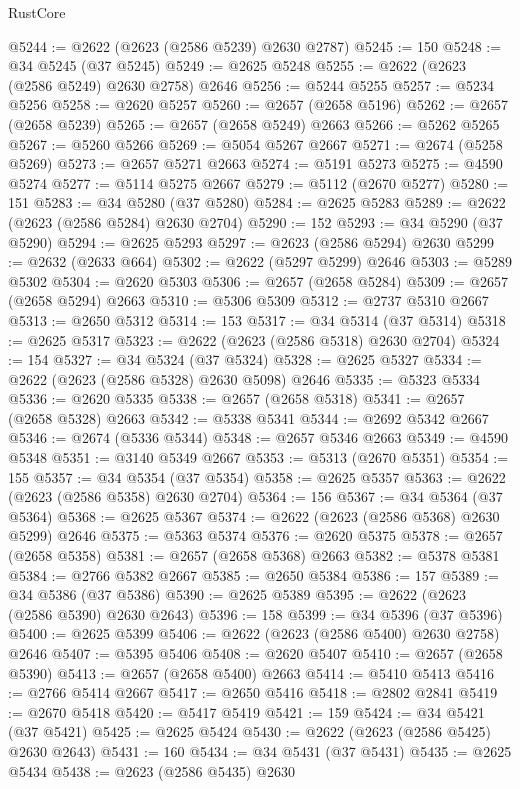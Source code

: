 \begin{lexlean}{RustCore}
\begin{coremodule}
@5244 := @2622 (@2623 (@2586 @5239) @2630 @2787)
@5245 := 150
@5248 := @34 @5245 (@37 @5245)
@5249 := @2625 @5248
@5255 := @2622 (@2623 (@2586 @5249) @2630 @2758) @2646
@5256 := @5244 @5255
@5257 := @5234 @5256
@5258 := @2620 @5257
@5260 := @2657 (@2658 @5196)
@5262 := @2657 (@2658 @5239)
@5265 := @2657 (@2658 @5249) @2663
@5266 := @5262 @5265
@5267 := @5260 @5266
@5269 := @5054 @5267 @2667
@5271 := @2674 (@5258 @5269)
@5273 := @2657 @5271 @2663
@5274 := @5191 @5273
@5275 := @4590 @5274
@5277 := @5114 @5275 @2667
@5279 := @5112 (@2670 @5277)
@5280 := 151
@5283 := @34 @5280 (@37 @5280)
@5284 := @2625 @5283
@5289 := @2622 (@2623 (@2586 @5284) @2630 @2704)
@5290 := 152
@5293 := @34 @5290 (@37 @5290)
@5294 := @2625 @5293
@5297 := @2623 (@2586 @5294) @2630
@5299 := @2632 (@2633 @664)
@5302 := @2622 (@5297 @5299) @2646
@5303 := @5289 @5302
@5304 := @2620 @5303
@5306 := @2657 (@2658 @5284)
@5309 := @2657 (@2658 @5294) @2663
@5310 := @5306 @5309
@5312 := @2737 @5310 @2667
@5313 := @2650 @5312
@5314 := 153
@5317 := @34 @5314 (@37 @5314)
@5318 := @2625 @5317
@5323 := @2622 (@2623 (@2586 @5318) @2630 @2704)
@5324 := 154
@5327 := @34 @5324 (@37 @5324)
@5328 := @2625 @5327
@5334 := @2622 (@2623 (@2586 @5328) @2630 @5098) @2646
@5335 := @5323 @5334
@5336 := @2620 @5335
@5338 := @2657 (@2658 @5318)
@5341 := @2657 (@2658 @5328) @2663
@5342 := @5338 @5341
@5344 := @2692 @5342 @2667
@5346 := @2674 (@5336 @5344)
@5348 := @2657 @5346 @2663
@5349 := @4590 @5348
@5351 := @3140 @5349 @2667
@5353 := @5313 (@2670 @5351)
@5354 := 155
@5357 := @34 @5354 (@37 @5354)
@5358 := @2625 @5357
@5363 := @2622 (@2623 (@2586 @5358) @2630 @2704)
@5364 := 156
@5367 := @34 @5364 (@37 @5364)
@5368 := @2625 @5367
@5374 := @2622 (@2623 (@2586 @5368) @2630 @5299) @2646
@5375 := @5363 @5374
@5376 := @2620 @5375
@5378 := @2657 (@2658 @5358)
@5381 := @2657 (@2658 @5368) @2663
@5382 := @5378 @5381
@5384 := @2766 @5382 @2667
@5385 := @2650 @5384
@5386 := 157
@5389 := @34 @5386 (@37 @5386)
@5390 := @2625 @5389
@5395 := @2622 (@2623 (@2586 @5390) @2630 @2643)
@5396 := 158
@5399 := @34 @5396 (@37 @5396)
@5400 := @2625 @5399
@5406 := @2622 (@2623 (@2586 @5400) @2630 @2758) @2646
@5407 := @5395 @5406
@5408 := @2620 @5407
@5410 := @2657 (@2658 @5390)
@5413 := @2657 (@2658 @5400) @2663
@5414 := @5410 @5413
@5416 := @2766 @5414 @2667
@5417 := @2650 @5416
@5418 := @2802 @2841
@5419 := @2670 @5418
@5420 := @5417 @5419
@5421 := 159
@5424 := @34 @5421 (@37 @5421)
@5425 := @2625 @5424
@5430 := @2622 (@2623 (@2586 @5425) @2630 @2643)
@5431 := 160
@5434 := @34 @5431 (@37 @5431)
@5435 := @2625 @5434
@5438 := @2623 (@2586 @5435) @2630

\end{coremodule}
\end{lexlean}
